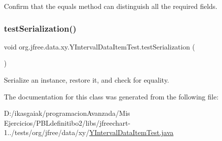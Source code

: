 Confirm that the equals method can distinguish all the required fields. \mbox{\label{classorg_1_1jfree_1_1data_1_1xy_1_1_y_interval_data_item_test_a85c3642e2c983960d40f859056a73f17}} 
\subsubsection{\texorpdfstring{test\+Serialization()}{testSerialization()}}
{\footnotesize\ttfamily void org.\+jfree.\+data.\+xy.\+Y\+Interval\+Data\+Item\+Test.\+test\+Serialization (\begin{DoxyParamCaption}{ }\end{DoxyParamCaption})}

Serialize an instance, restore it, and check for equality. 

The documentation for this class was generated from the following file\+:\begin{DoxyCompactItemize}
\item 
D\+:/ikasgaiak/programacion\+Avanzada/\+Mis Ejercicios/\+P\+B\+Ldefinitibo2/libs/jfreechart-\/1../tests/org/jfree/data/xy/\mbox{\hyperlink{_y_interval_data_item_test_8java}{Y\+Interval\+Data\+Item\+Test.\+java}}\end{DoxyCompactItemize}
